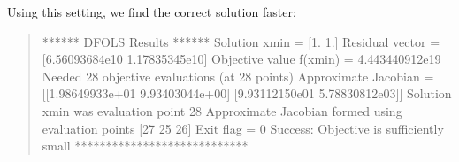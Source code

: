 \documentclass[letterpaper,10pt,english]{sphinxmanual}
\begin{document}
\sphinxAtStartPar
Using this setting, we find the correct solution faster:
\begin{quote}

\begin{sphinxVerbatim}[commandchars=\\\{\}]
****** DFO\PYGZhy{}LS Results ******
Solution xmin = [1. 1.]
Residual vector = [\PYGZhy{}6.56093684e\PYGZhy{}10 \PYGZhy{}1.17835345e\PYGZhy{}10]
Objective value f(xmin) = 4.443440912e\PYGZhy{}19
Needed 28 objective evaluations (at 28 points)
Approximate Jacobian = [[\PYGZhy{}1.98649933e+01  9.93403044e+00]
 [\PYGZhy{}9.93112150e\PYGZhy{}01  5.78830812e\PYGZhy{}03]]
Solution xmin was evaluation point 28
Approximate Jacobian formed using evaluation points [27 25 26]
Exit flag = 0
Success: Objective is sufficiently small
****************************
\end{sphinxVerbatim}
\end{quote}
\end{document}
